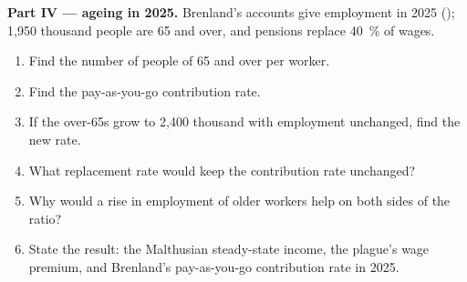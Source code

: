 \begin{problem}
\medskip\noindent\textbf{Part IV --- ageing in 2025.} Brenland's accounts give employment in 2025
(); 1{,}950 thousand people are 65 and over, and pensions replace 40~\% of wages.
\begin{enumerate}[resume]
\item Find the number of people of 65 and over per worker.
\item Find the pay-as-you-go contribution rate.
\item If the over-65s grow to 2{,}400 thousand with employment unchanged, find the new rate.
\item What replacement rate would keep the contribution rate unchanged?
\item Why would a rise in employment of older workers help on both sides of the ratio?
\item State the result: the Malthusian steady-state income, the plague's wage premium,
and Brenland's pay-as-you-go contribution rate in 2025.
\end{enumerate}
\end{problem}
